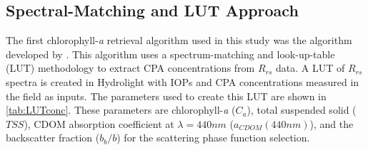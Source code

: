 \subsection{Spectral-Matching and LUT Approach}
\label{subsec:LUTapproach}
The first chlorophyll-{\it a} retrieval algorithm used in this study was the algorithm developed by \cite{Concha2013IGARSS}. This algorithm uses a spectrum-matching and look-up-table (LUT) methodology to extract CPA concentrations from $R_{rs}$ data. A LUT of $R_{rs}$ spectra is created in Hydrolight \cite{MobleyHE} with IOPs and CPA concentrations measured in the field as inputs. The parameters used to create this LUT are shown in \autoref{tab:LUTconc}. These parameters are chlorophyll-{\it a} ($C_a$), total suspended solid ($TSS$), CDOM absorption coefficient at $\lambda=440nm$ ($a_{CDOM}(440nm)$), and the backscatter fraction ($b_b/b$) for the scattering phase function selection.

